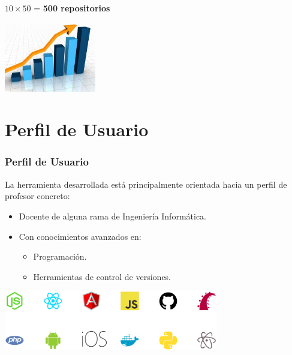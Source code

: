 \documentclass{beamer}
\begin{document}
\begin{frame}[allowframebreaks]
	\begin{center}
		$10 \times 50$ = {\bfseries 500 repositorios}
	\end{center}
	\begin{center}
		\includegraphics[width=0.3\textwidth]{images/grafico-ascendente.eps}	
	\end{center}
	
\end{frame}
  
\section{Perfil de Usuario}
\begin{frame}
  \frametitle{Perfil de Usuario}
  La herramienta desarrollada está principalmente orientada hacia un perfil de profesor concreto:
  \bigskip
    
  \begin{itemize}
	\item Docente de alguna rama de Ingeniería Informática.
	\item Con conocimientos avanzados en:
	\begin{itemize}
		\item Programación.
		\item Herramientas de control de versiones.
	\end{itemize}
  \end{itemize}
  
  \begin{center}
		\includegraphics[width=0.7\textwidth]{images/technologies.eps}	
	\end{center}

\end{frame}
\end{document}
